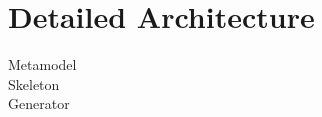 \section{Detailed Architecture}
\label{DetailedArchitecture}

Metamodel \\
Skeleton \\
Generator \\
